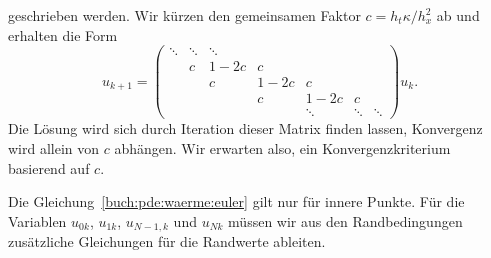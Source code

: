 geschrieben werden.
Wir kürzen den gemeinsamen Faktor $c=h_t\kappa/h_x^2$ ab und erhalten
die Form
\[
u_{k+1}
=
\begin{pmatrix}
\ddots&\ddots&\ddots&    &      &      &      \\
      &     c&  1-2c&  c &      &      &      \\
      &      &    c &1-2c&  c   &      &      \\
      &      &      &  c &1-2c  &  c   &      \\
      &      &      &    &\ddots&\ddots&\ddots
\end{pmatrix}
u_k.
\]
Die Lösung wird sich durch Iteration dieser Matrix finden lassen,
Konvergenz wird allein von $c$ abhängen.
Wir erwarten also, ein Konvergenzkriterium basierend auf $c$.
%

Die Gleichung~\eqref{buch:pde:waerme:euler} gilt nur für innere Punkte.
Für die Variablen $u_{0k}$, $u_{1k}$, $u_{N-1,k}$ und $u_{Nk}$ müssen
wir aus den Randbedingungen zusätzliche Gleichungen für die Randwerte
ableiten.

